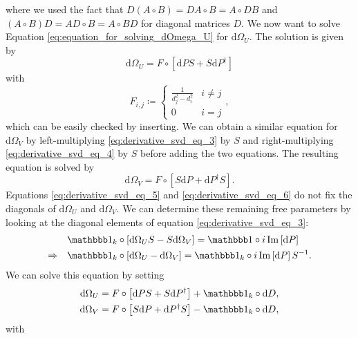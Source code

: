 where we used the fact that $D(A\circ B) = DA\circ B = A\circ DB$ and $(A\circ B)D = AD\circ B = A\circ BD$ for diagonal matrices $D$. We now want to solve Equation \eqref{eq:equation_for_solving_dOmega_U} for $\text{d}\Omega_U$. The solution is given by
\begin{equation}
	\label{eq:derivative_svd_eq_5}
	\text{d}\Omega_U = F\circ\left[\text{d}PS+S\text{d}P^\dagger\right]
\end{equation}
with 
\begin{equation}
	\label{eq:svd_derivative_F_definition}
	F_{i,j} \coloneqq \begin{cases}
		\frac{1}{d_j^2-d_i^2} &i \neq j\\
		0 &i = j
	\end{cases},
\end{equation}
which can be easily checked by inserting. We can obtain a similar equation for $\text{d}\Omega_V$ by left-multiplying \eqref{eq:derivative_svd_eq_3} by $S$ and right-multiplying \eqref{eq:derivative_svd_eq_4} by $S$ before adding the two equations. The resulting equation is solved by
\begin{equation}
	\label{eq:derivative_svd_eq_6}
	\text{d}\Omega_V = F\circ\left[S\text{d}P+\text{d}P^\dagger S\right].
\end{equation}
Equations \eqref{eq:derivative_svd_eq_5} and \eqref{eq:derivative_svd_eq_6} do not fix the diagonals of $\text{d}\Omega_U$ and $\text{d}\Omega_V$. We can determine these remaining free parameters by looking at the diagonal elements of equation \eqref{eq:derivative_svd_eq_3}:
\begin{equation}
	\begin{split}
		&\id_k\circ\left[\text{d}\Omega_US-S\text{d}\Omega_V\right] = \id\circ i\Im\left[\text{d}P\right] \\
		\Rightarrow \quad &\id_k\circ\left[\text{d}\Omega_U-\text{d}\Omega_V\right] = \id_k\circ i\Im\left[\text{d}P\right]S^{-1}.
	\end{split}
\end{equation}
We can solve this equation by setting
\begin{equation}
	\begin{split}
		\text{d}\Omega_U &= F\circ\left[\text{d}PS + S\text{d}P^\dagger\right] + \id_k\circ\text{d}D,\\
		\text{d}\Omega_V &= F\circ\left[S\text{d}P + \text{d}P^\dagger S\right] - \id_k\circ\text{d}D,
	\end{split}
\end{equation}
with
